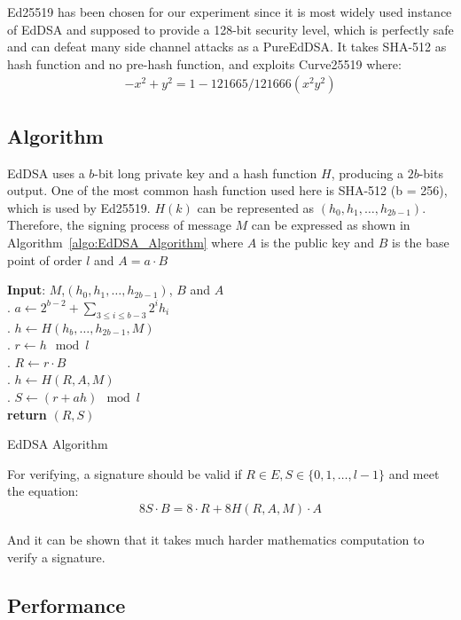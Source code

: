 \documentclass[10pt,sigconf]{acmart}
\begin{document}
Ed25519 has been chosen for our experiment since it is most widely used instance of EdDSA and supposed to provide a 128-bit security level, which is perfectly safe and can defeat many side channel attacks as a PureEdDSA. It takes SHA-512 as hash function and no pre-hash function, and exploits Curve25519 where:
\begin{align*}
-x^2 + y^2 = 1 - 121665/121666(x^2y^2)    
\end{align*}

\subsection{Algorithm}
EdDSA uses a $b$-bit long private key and a hash function $H$, producing a $2b$-bits output. One of the most common hash function used here is SHA-512 (b = 256), which is used by Ed25519. $H(k)$ can be represented as $(h_0,h_1,\dots,h_{2b-1})$. Therefore, the signing process of message $M$ can be expressed as shown in Algorithm~\ref{algo:EdDSA_Algorithm} where $A$ is the public key and $B$ is the base point of order $l$ and $A=a \cdot B$

\begin{algorithm}
\begin{algorithmic}
\STATE \textbf{Input}: $M$,$(h_0,h_1,\dots,h_{2b-1})$, $B$ and $A$ \\
. $a \gets 2^{b-2} + \sum_{3\leq i \leq b-3} 2^i h_i$ \\
. $h \gets H(h_b,\dots,h_{2b-1},M)$ \\
. $r \gets h \mod l$ \\
. $R \gets r \cdot B $ \\
. $h \gets H(R,A,M)$ \\
. $S \gets (r+ah) \mod l$
\\
\textbf{return} $(R,S)$
\end{algorithmic}
\caption{EdDSA Algorithm}
\label{algo:EdDSA_Algorithm}
\end{algorithm}


\noindent For verifying, a signature should be valid if $R \in E, S \in \{0,1,\dots,l-1\}$ and meet the equation:
\begin{align*}
    8S \cdot B = 8 \cdot R + 8H(R,A,M) \cdot A
\end{align*}

\noindent And it can be shown that it takes much harder mathematics computation to verify a signature.


\subsection{Performance}
\end{document}
